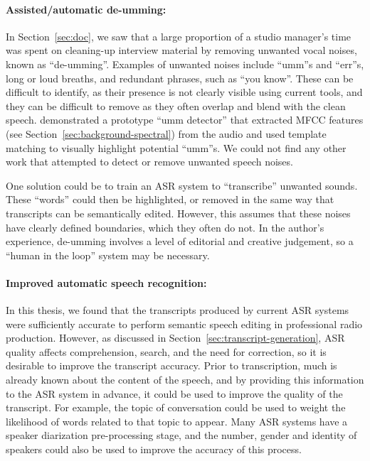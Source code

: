 \paragraph{Assisted/automatic de-umming:}

In Section~\ref{sec:doc}, we saw that a large proportion of a studio manager's time was spent on cleaning-up interview
material by removing unwanted vocal noises, known as ``de-umming''. Examples of unwanted noises include ``umm''s and
``err''s, long or loud breaths, and redundant phrases, such as ``you know''.  These can be difficult to identify, as
their presence is not clearly visible using current tools, and they can be difficult to remove as they often overlap
and blend with the clean speech. \citet{Loviscach2013} demonstrated a prototype ``umm detector'' that extracted MFCC
features (see Section~\ref{sec:background-spectral}) from the audio and used template matching to visually highlight
potential ``umm''s. We could not find any other work that attempted to detect or remove unwanted speech noises.

One solution could be to train an
ASR system to ``transcribe'' unwanted sounds. These ``words'' could then be highlighted, or removed in the same way
that transcripts can be semantically edited.  However, this assumes that these noises have clearly defined boundaries,
which they often do not.  In the author's experience, de-umming involves a level of editorial and creative judgement,
so a ``human in the loop'' system may be necessary.

\paragraph{Improved automatic speech recognition:}

In this thesis, we found that the transcripts produced by current ASR systems were sufficiently accurate to perform
semantic speech editing in professional radio production. However, as discussed in
Section~\ref{sec:transcript-generation}, ASR quality affects comprehension, search, and the need for correction, so it
is desirable to improve the transcript accuracy. Prior to transcription, much is already known about the content of the
speech, and by providing this information to the ASR system in advance, it could be used to improve the quality of the
transcript.  For example, the topic of conversation could be used to weight the likelihood of words related to that
topic to appear.  Many ASR systems have a speaker diarization pre-processing stage, and the number, gender and identity
of speakers could also be used to improve the accuracy of this process.

